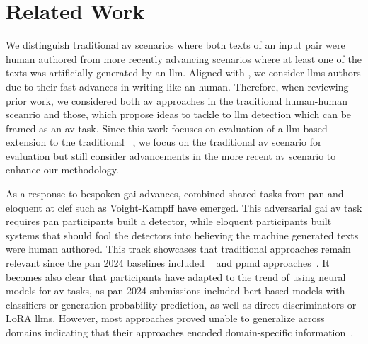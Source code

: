 \chapter{Related Work}
\label{chap:related_work}

We distinguish traditional \ac{av} scenarios where both texts of an input pair were human authored from more recently advancing scenarios where at least one of the texts was artificially generated by an \ac{llm}.
Aligned with \citet{llm_detection_av_2025}, we consider \acp{llm} authors due to their fast advances in writing like an human.
Therefore, when reviewing prior work, we considered both \ac{av} approaches in the traditional human-human sceanrio and those, which propose ideas to tackle to \ac{llm} detection which can be framed as an \ac{av} task.
Since this work focuses on evaluation of a \ac{llm}-based extension to the traditional \impAppr{}~\citep{koppel_determining_2014}, we focus on the traditional \ac{av} scenario for evaluation but still consider advancements in the more recent \ac{av} scenario to enhance our methodology.

As a response to bespoken \ac{gai} advances, combined shared tasks from \acs{pan} and \acs{eloquent} at \acs{clef} such as Voight-Kampff have emerged.
This adversarial \ac{gai} \ac{av} task requires \acs{pan} participants built a detector, while \acs{eloquent} participants built systems that should fool the detectors into believing the machine generated texts were human authored.
This track showcases that traditional approaches remain relevant since the \acs{pan} 2024 baselines included \unmasking{}~\citep{koppel_authorship_2004,koppel_authorship_2011,bevendorff_generalizing_2019,bevendorff_divergence_based_2020} and \ac{ppmd} approaches~\citep{tyo_state_2022,neal_surveying_2018}.
It becomes also clear that participants have adapted to the trend of using neural models for \ac{av} tasks, as \acs{pan} 2024 submissions included \acs{bert}-based models with classifiers or generation probability prediction, as well as direct discriminators or LoRA \acp{llm}.
However, most approaches proved unable to generalize across domains indicating that their approaches encoded domain-specific information~\citep{bevendorff_overview_2024}.

